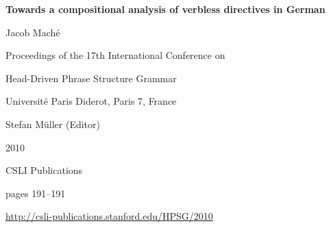 \documentclass[a4paper,11pt]{article}
\begin{document}
\begin{center}
  {\huge\bf Towards a compositional analysis of verbless directives in German\par}

  \bigskip

  {\LARGE Jacob Mach\'{e}\par}

  \vspace*{3\bigskipamount}

  Proceedings of the 17th International Conference on\par Head-Driven Phrase Structure Grammar

  \bigskip

  Universit\'{e} Paris Diderot, Paris 7, France

  \medskip

  Stefan Müller (Editor)

  \medskip

  2010

  \medskip

  CSLI Publications

  \medskip

  pages 191--191

  \medskip

  \url{http://csli-publications.stanford.edu/HPSG/2010}
\end{center}

\newpage

        
\end{document}
